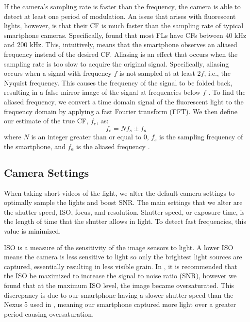 \documentclass[conference]{IEEEtran}
\begin{document}
If the camera's sampling rate is faster than the frequency, the camera is able to detect at least one period of modulation. An issue that arises with fluorescent lights, however, is that their CF is much faster than the sampling rate of typical smartphone cameras. Specifically, \cite{zhang2016litell} found that most FLs have CFs between 40 kHz and 200 kHz. This, intuitively, means that the smartphone observes an aliased frequency instead of the desired CF. Aliasing is an effect that occurs when the sampling rate is too slow to acquire the original signal. Specifically, aliasing occurs when a signal with frequency $f$ is not sampled at at least $2f$, i.e., the Nyquist frequency. This causes the frequency of the signal to be folded back, resulting in a false mirror image of the signal at frequencies below $f$ \cite{cerna2000fundamentals}. To find the aliased frequency, we convert a time domain signal of the fluorescent light to the frequency domain by applying a fast Fourier transform (FFT). We then define our estimate of the true CF, $f_e$, as: 
\begin{equation}
f_e = N f_s \pm f_a
\end{equation}
where $N$ is an integer greater than or equal to $0$, $f_s$ is the sampling frequency of the smartphone, and $f_a$ is the aliased frequency \cite{zhang2016litell}.

\subsection{Camera Settings}

When taking short videos of the light, we alter the default camera settings to optimally sample the lights and boost SNR. The main settings that we alter are the shutter speed, ISO, focus, and resolution. Shutter speed, or exposure time, is the length of time that the shutter allows in light. To detect fast frequencies, this value is minimized. 

ISO is a measure of the sensitivity of the image sensors to light. A lower ISO means the camera is less sensitive to light so only the brightest light sources are captured, essentially resulting in less visible grain. In \cite{zhang2016litell}, it is recommended that the ISO be maximized to increase the signal to noise ratio (SNR), however we found that at the maximum ISO level, the image became oversaturated. This discrepancy is due to our smartphone having a slower shutter speed than the Nexus 5 used in \cite{zhang2016litell}, meaning our smartphone captured more light over a greater period causing oversaturation.
\end{document}
